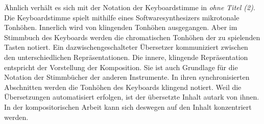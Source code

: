 \documentclass[12pt,a4paper,ngerman]{article}
\begin{document}
Ähnlich verhält es sich mit der Notation der Keyboardstimme in \emph{ohne Titel (2)}.
Die Keyboardstimme spielt mithilfe eines Softwaresynthesizers mikrotonale Tonhöhen.
Innerlich wird von klingenden Tonhöhen ausgegangen.
Aber im Stimmbuch des Keyboards werden die chromatischen Tonhöhen der zu spielenden Tasten notiert.
Ein dazwischengeschalteter Übersetzer kommuniziert zwischen den unterschiedlichen Repräsentationen.
Die innere, klingende Repräsentation entspricht der Vorstellung der Komposition.
Sie ist auch Grundlage für die Notation der Stimmbücher der anderen Instrumente.
In ihren synchronisierten Abschnitten werden die Tonhöhen des Keyboards klingend notiert.
Weil die Übersetzungen automatisiert erfolgen, ist der übersetzte Inhalt autark von ihnen.
In der kompositorischen Arbeit kann sich deswegen auf den Inhalt konzentriert werden.

% 



\bigskip
\end{document}

